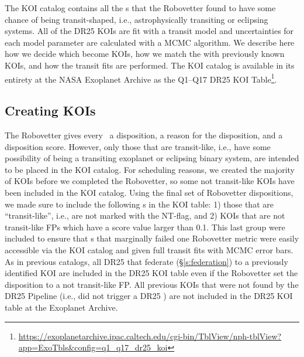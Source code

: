 \label{s:assemble}
The KOI catalog contains all the \opstce s that the Robovetter found to have some chance of being transit-shaped, i.e., astrophysically transiting or eclipsing systems. All of the DR25 KOIs are fit with a transit model and uncertainties for each model parameter are calculated with a MCMC algorithm.  We describe here how we decide which  become KOIs, how we match the  with previously known KOIs, and how the transit fits are performed. The KOI catalog is available in its entirety at the NASA Exoplanet Archive as the Q1--Q17 DR25 KOI Table\footnote{\url{https://exoplanetarchive.ipac.caltech.edu/cgi-bin/TblView/nph-tblView?app=ExoTbls\&config=q1\_q17\_dr25\_koi}}.
\label{koisec}

\subsection{Creating KOIs}
The Robovetter gives every \opstce\ a disposition, a reason for the disposition, and a disposition score.  However, only those that are transit-like, i.e., have some possibility of being a transiting exoplanet or eclipsing binary system, are intended to be placed in the KOI catalog. For scheduling reasons, we created the majority of KOIs before we completed the Robovetter, so some not transit-like KOIs have been included in the KOI catalog. Using the final set of Robovetter dispositions, we made sure to include the following \opstce s in the KOI table: 1) those that are ``transit-like'', i.e., are not marked with the NT-flag, and 2) KOIs that are not transit-like FPs which have a score value larger than 0.1.  This last group were included to ensure that \opstce s that marginally failed one Robovetter metric were easily accessible via the KOI catalog and given full transit fits with MCMC error bars. As in previous catalogs, all DR25  that federate (\S\ref{s:federation}) to a previously identified KOI are included in the DR25 KOI table even if the Robovetter set the disposition to a not transit-like FP. All previous KOIs that were not found by the DR25 \Kepler{} Pipeline (i.e., did not trigger a DR25 \opstce{}) are not included in the DR25 KOI table at the Exoplanet Archive.


